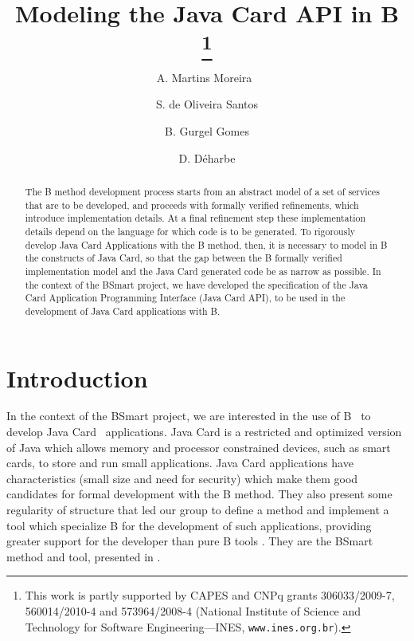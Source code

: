 \documentclass{llncs}
\begin{document}
\mainmatter

\title{Modeling the Java Card API in B \thanks{This work is partly supported by CAPES
 and CNPq grants 306033/2009-7, 560014/2010-4 and 573964/2008-4
 (National Institute of Science and Technology for Software Engineering---INES, \texttt{www.ines.org.br}).}}

\author{A. Martins Moreira\ \and S. de Oliveira Santos \and B. Gurgel Gomes \and D. D\'{e}harbe}


\maketitle

\begin{abstract} 
  The B method development process starts from an abstract model of a
  set of services that are to be developed, and proceeds with formally
  verified refinements, which introduce implementation details. At a
  final refinement step these implementation details depend on the
  language for which code is to be generated. To rigorously develop
  Java Card Applications with the B method, then, it is necessary to
  model in B the constructs of Java Card, so that the gap between the
  B formally verified implementation model and the Java Card generated
  code be as narrow as possible. In the context of the BSmart project,
  we have developed the specification of the Java Card Application
  Programming Interface (Java Card API), to be used in the development
  of Java Card applications with B.
\end{abstract}

\section{Introduction}\label{intro}

In the context of the BSmart project, we are interested in the use of
B~\cite{BBook} to develop Java Card~\cite{chen:2000} applications.  Java Card is a
restricted and optimized version of Java which allows memory and
processor constrained devices, such as smart cards, to store and run
small applications.  Java Card applications have characteristics
(small size and need for security) which make them good candidates for
formal development with the B method. They also present some
regularity of structure that led our group to define a method and
implement a tool which specialize B for the development of such
applications, providing greater support for the developer than pure B
tools \cite{atelierB,proB}. They are the BSmart method and tool,
presented in \cite{BSmart08,Gomes10}.
\end{document}
